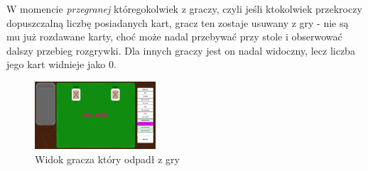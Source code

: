 \documentclass{article}
\begin{document}
W momencie \textit{przegranej} któregokolwiek z graczy, czyli jeśli ktokolwiek przekroczy dopuszczalną liczbę posiadanych kart, gracz ten zostaje usuwany z gry - nie są mu już rozdawane karty, choć może nadal przebywać przy stole i obserwować dalszy przebieg rozgrywki. Dla innych graczy jest on nadal widoczny, lecz liczba jego kart widnieje jako 0.

\begin{figure}[H]
\centering
\includegraphics[width=0.4\textwidth]{youdied}
\caption{Widok gracza który odpadł z gry}
\end{figure}
\end{document}
